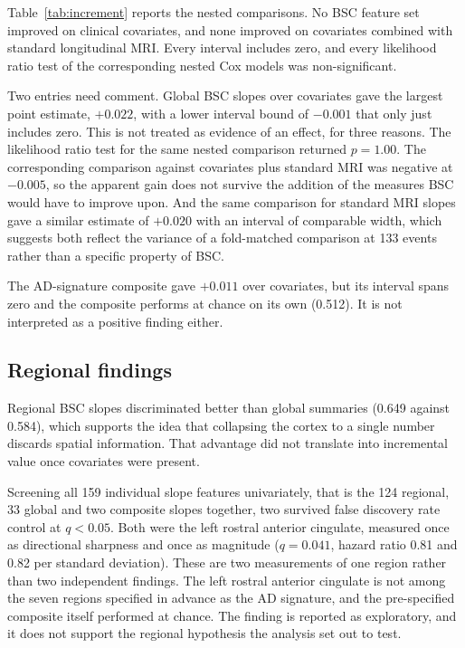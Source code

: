 \documentclass[blue]{ludusofficial}  %
\begin{document}
Table~\ref{tab:increment} reports the nested comparisons. No BSC feature set improved on clinical covariates, and none improved on covariates combined with standard longitudinal MRI. Every interval includes zero, and every likelihood ratio test of the corresponding nested Cox models was non-significant.

Two entries need comment. Global BSC slopes over covariates gave the largest point estimate, $+0.022$, with a lower interval bound of $-0.001$ that only just includes zero. This is not treated as evidence of an effect, for three reasons. The likelihood ratio test for the same nested comparison returned $p = 1.00$. The corresponding comparison against covariates plus standard MRI was negative at $-0.005$, so the apparent gain does not survive the addition of the measures BSC would have to improve upon. And the same comparison for standard MRI slopes gave a similar estimate of $+0.020$ with an interval of comparable width, which suggests both reflect the variance of a fold-matched comparison at 133 events rather than a specific property of BSC.

The AD-signature composite gave $+0.011$ over covariates, but its interval spans zero and the composite performs at chance on its own (0.512). It is not interpreted as a positive finding either.

\subsection{Regional findings}

Regional BSC slopes discriminated better than global summaries (0.649 against 0.584), which supports the idea that collapsing the cortex to a single number discards spatial information. That advantage did not translate into incremental value once covariates were present.

Screening all 159 individual slope features univariately, that is the 124 regional, 33 global and two composite slopes together, two survived false discovery rate control at $q<0.05$. Both were the left rostral anterior cingulate, measured once as directional sharpness and once as magnitude ($q=0.041$, hazard ratio 0.81 and 0.82 per standard deviation). These are two measurements of one region rather than two independent findings. The left rostral anterior cingulate is not among the seven regions specified in advance as the AD signature, and the pre-specified composite itself performed at chance. The finding is reported as exploratory, and it does not support the regional hypothesis the analysis set out to test.
\end{document}
